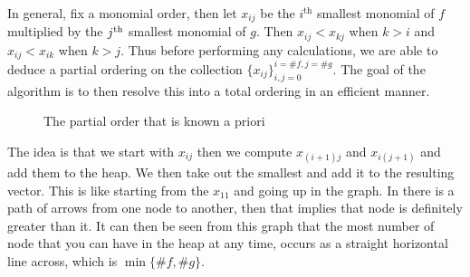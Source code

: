 In general, fix a monomial order, then let $x_{ij}$ be the $i^{\text{th}}$ smallest monomial of $f$ multiplied by the $j^{\textrm{th}}$ smallest monomial of $g$. Then $x_{ij} < x_{kj}$ when $k > i$ and $x_{ij} < x_{ik}$ when $k > j$. Thus before performing any calculations, we are able to deduce a partial ordering on the collection $\{x_{ij}\}_{i, j=0}^{i=\# f, j = \#g}$. The goal of the algorithm is to then resolve this into a total ordering in an efficient manner.

\begin{figure}
    \center
    \caption{The partial order that is known a priori}
\end{figure}

The idea is that we start with $x_{ij}$ then we compute $x_{(i+1)j}$ and $x_{i(j+1)}$ and add them to the heap. We then take out the smallest and add it to the resulting vector. This is like starting from the $x_{11}$ and going up in the graph. In there is a path of arrows from one node to another, then that implies that node is definitely greater than it. It can then be seen from this graph that the most number of node that you can have in the heap at any time, occurs as a straight horizontal line across, which is $\min\{\# f, \# g\}$.


